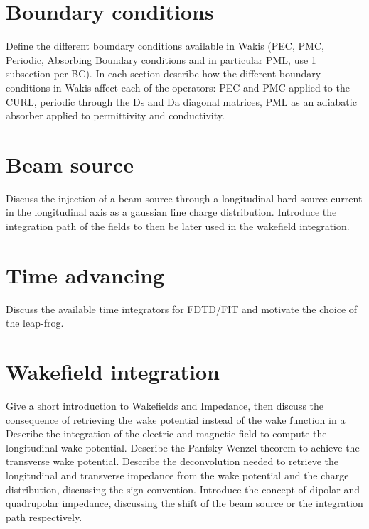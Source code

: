 \section{Boundary conditions}
Define the different boundary conditions available in Wakis (PEC, PMC, Periodic, Absorbing Boundary conditions and in particular PML, use 1 subsection per BC). In each section describe how the different boundary conditions in Wakis affect each of the operators: PEC and PMC applied to the CURL, periodic through the Ds and Da diagonal matrices, PML as an adiabatic absorber applied to permittivity and conductivity.

\section{Beam source}
Discuss the injection of a beam source through a longitudinal hard-source current in the longitudinal axis as a gaussian line charge distribution. Introduce the integration path of the fields to then be later used in the wakefield integration.

\section{Time advancing}
Discuss the available time integrators for FDTD/FIT and motivate the choice of the leap-frog.


\section{Wakefield integration}
Give a short introduction to Wakefields and Impedance, then discuss the consequence of retrieving the wake potential instead of the wake function in a
Describe the integration of the electric and magnetic field to compute the longitudinal wake potential. Describe the Panfsky-Wenzel theorem to achieve the transverse wake potential. Describe the deconvolution needed to retrieve the longitudinal and transverse impedance from the wake potential and the charge distribution, discussing the sign convention. Introduce the concept of dipolar and quadrupolar impedance, discussing the shift of the beam source or the integration path respectively.

